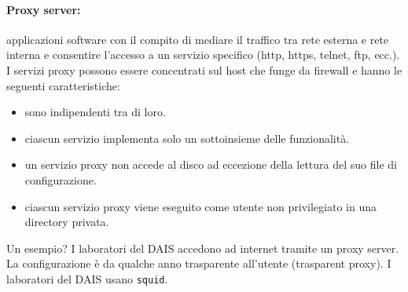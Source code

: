\documentclass[a4paper]{report}
\begin{document}
\paragraph{Proxy server:} applicazioni software con il compito di mediare il traffico tra rete
esterna e rete interna e consentire l'accesso a un servizio specifico (http, https,
telnet, ftp, ecc.).\\
I servizi proxy possono essere concentrati sul host che funge da firewall e
hanno le seguenti caratteristiche:
\begin{itemize}
\item sono indipendenti tra di loro.
\item ciascun servizio implementa solo un sottoinsieme delle funzionalità.
\item un servizio proxy non accede al disco ad eccezione della lettura del suo file di
configurazione.
\item ciascun servizio proxy viene eseguito come utente non privilegiato in una directory
privata.
\end{itemize}
Un esempio? I laboratori del DAIS accedono ad internet tramite un proxy server. La configurazione è da qualche anno trasparente all'utente (trasparent proxy). I laboratori del DAIS usano \texttt{squid}.\\
\end{document}
